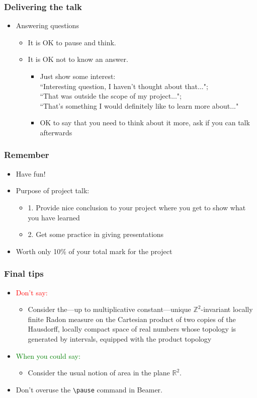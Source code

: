 \documentclass[t]{beamer} %
\begin{document}
\begin{frame}
\frametitle{Delivering the talk}
\begin{itemize}
\item Answering questions
\begin{itemize}
\item It is OK to pause and think.
\item It is OK not to know an answer. 
\begin{itemize}
\item Just show some interest: \\ ``Interesting question, I haven't thought about that...";\\
``That was outside the scope of my project..."; \\``That's something I would definitely like to learn more about..."
\item OK to say that you need to think about it more, ask if you can talk afterwards
\end{itemize}
\end{itemize}
\end{itemize}
\end{frame}

\begin{frame}
\frametitle{Remember}
\begin{itemize}
\item Have fun! 
\item Purpose of project talk: 
\begin{itemize}
\item 1. Provide nice conclusion to your project where you get to show what you have learned
\item 2. Get some practice in giving presentations
\end{itemize}
\item Worth only 10\% of your total mark for the project
\end{itemize}
\end{frame}

\begin{frame}
\frametitle{Final tips}
\begin{itemize}
\pause\item{{\textcolor{red}{Don't say:}}}
\begin{itemize}
\item Consider the---up to multiplicative constant---unique $\mathbb{Z}^2$-invariant locally finite Radon measure on the Cartesian product of two copies of the Hausdorff, locally compact space of real numbers whose topology is generated by intervals, equipped with the product topology \end{itemize}
\pause\item {\textcolor{green}{When you could say:}}
\begin{itemize}
\item Consider the usual notion of area in the plane $\mathbb{R}^2$. 
\end{itemize}

\pause
\item Don't overuse the \texttt{\textbackslash pause} command in Beamer.
\end{itemize}
\end{frame}
\end{document}
